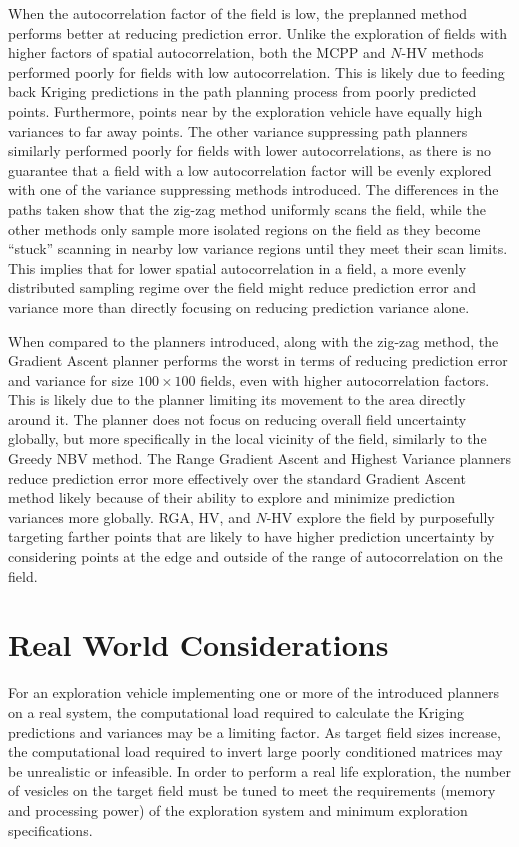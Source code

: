 When the autocorrelation factor of the field is low, the preplanned method performs better at reducing prediction error. Unlike the exploration of fields with higher factors of spatial autocorrelation, both the MCPP and $N$-HV methods performed poorly for fields with low autocorrelation. This is likely due to feeding back Kriging predictions in the path planning process from poorly predicted points. Furthermore, points near by the exploration vehicle have equally high variances to far away points. The other variance suppressing path planners similarly performed poorly for fields with lower autocorrelations, as there is no guarantee that a field with a low autocorrelation factor will be evenly explored with one of the variance suppressing methods introduced. The differences in the paths taken show that the zig-zag method uniformly scans the field, while the other methods only sample more isolated regions on the field as they become ``stuck'' scanning in nearby low variance regions until they meet their scan limits. This implies that for lower spatial autocorrelation in a field, a more evenly distributed sampling regime over the field might reduce prediction error and variance more than directly focusing on reducing prediction variance alone.

When compared to the planners introduced, along with the zig-zag method, the Gradient Ascent planner performs the worst in terms of reducing prediction error and variance for size $100 \times 100$ fields, even with higher autocorrelation factors. This is likely due to the planner limiting its movement to the area directly around it. The planner does not focus on reducing overall field uncertainty globally, but more specifically in the local vicinity of the field, similarly to the Greedy NBV method. The Range Gradient Ascent and Highest Variance planners reduce prediction error more effectively over the standard Gradient Ascent method likely because of their ability to explore and minimize prediction variances more globally. RGA, HV, and $N$-HV explore the field by purposefully targeting farther points that are likely to have higher prediction uncertainty by considering points at the edge and outside of the range of autocorrelation on the field.

\section{Real World Considerations}
For an exploration vehicle implementing one or more of the introduced planners on a real system, the computational load required to calculate the Kriging predictions and variances may be a limiting factor. As target field sizes increase, the computational load required to invert large poorly conditioned matrices may be unrealistic or infeasible. In order to perform a real life exploration, the number of vesicles on the target field must be tuned to meet the requirements (memory and processing power) of the exploration system and minimum exploration specifications. 

